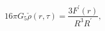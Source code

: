\begin{equation}
\label{dynamics2}16\pi G_{5}
\check{\rho}(r,\tau)=\frac{3F^{'}(r)}{R^3 R^{'}},
\end{equation}

